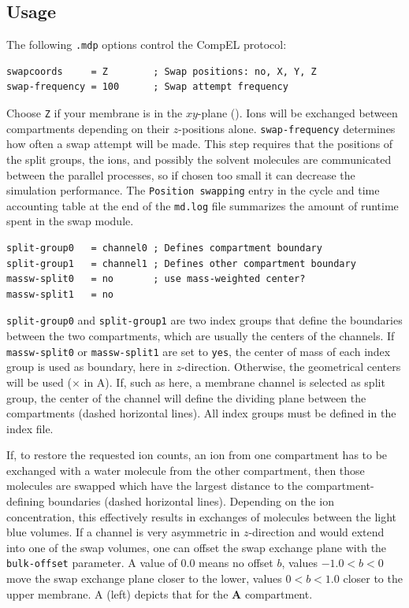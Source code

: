 \subsection{Usage}
The following {\tt .mdp} options control the CompEL protocol:
{\small
\begin{verbatim}
swapcoords     = Z        ; Swap positions: no, X, Y, Z
swap-frequency = 100      ; Swap attempt frequency
\end{verbatim}}
Choose {\tt Z} if your membrane is in the $xy$-plane ().
Ions will be exchanged between compartments depending on their $z$-positions alone.
{\tt swap-frequency} determines how often a swap attempt will be made.
This step requires that the positions of the split groups, the ions, and possibly the solvent molecules are
communicated between the parallel processes, so if chosen too small it can decrease the simulation
performance. The {\tt Position swapping} entry in the cycle and time accounting
table at the end of the {\tt md.log} file summarizes the amount of runtime spent
in the swap module.
{\small
\begin{verbatim}
split-group0   = channel0 ; Defines compartment boundary
split-group1   = channel1 ; Defines other compartment boundary
massw-split0   = no       ; use mass-weighted center?
massw-split1   = no
\end{verbatim}}
{\tt split-group0} and {\tt split-group1} are two index groups that define the boundaries
between the two compartments, which are usually the centers of the channels.
If {\tt massw-split0} or {\tt massw-split1} are set to {\tt yes}, the center of mass
of each index group is used as boundary, here in $z$-direction. Otherwise, the
geometrical centers will be used ($\times$ in  A). If, such as here, a membrane
channel is selected as split group, the center of the channel will define the dividing
plane between the compartments (dashed horizontal lines). All index groups
must be defined in the index file.

If, to restore the requested ion counts, an ion from one compartment has to be exchanged
with a water molecule from the other compartment, then those molecules are swapped
which have the largest distance to the compartment-defining boundaries
(dashed horizontal lines). Depending on the ion concentration,
this effectively results in exchanges of molecules between the light blue volumes.
If a channel is very asymmetric in $z$-direction and would extend into one of the
swap volumes, one can offset the swap exchange plane with the {\tt bulk-offset}
parameter. A value of 0.0 means no offset $b$, values $-1.0 < b < 0$ move the
swap exchange plane closer to the lower, values $0 < b < 1.0$ closer to the upper
membrane.  A (left) depicts that for the {\bf A} compartment.

